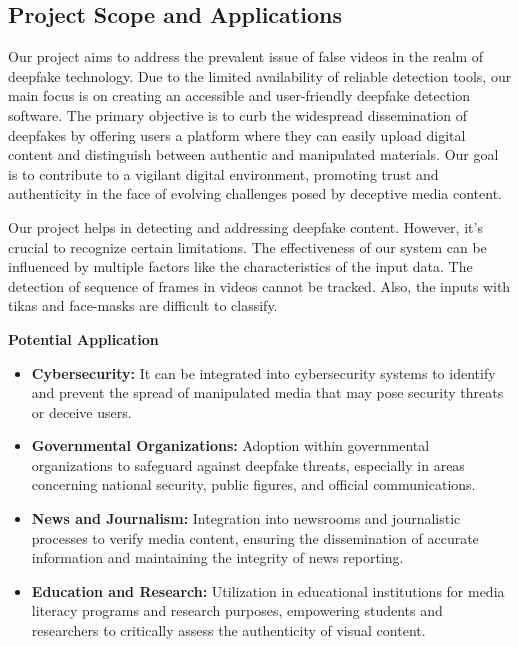 \subsection{Project Scope and Applications}
Our project aims to address the prevalent issue of false videos in the realm of deepfake technology. Due to the limited availability of reliable detection tools, our main focus is on creating an accessible and user-friendly deepfake detection software. The primary objective is to curb the widespread dissemination of deepfakes by offering users a platform where they can easily upload digital content and distinguish between authentic and manipulated materials. Our goal is to contribute to a vigilant digital environment, promoting trust and authenticity in the face of evolving challenges posed by deceptive media content.

\noindent Our project helps in detecting and addressing deepfake content. However, it's crucial to recognize certain limitations. The effectiveness of our system  can be influenced by multiple factors like the characteristics of the input data. The detection of sequence of frames in videos cannot be tracked. Also, the inputs with tikas and face-masks are difficult to classify.\\

\vspace{0.1in}

\noindent \textbf{Potential Application}

\begin{itemize}
    \item \textbf{Cybersecurity:} It can be integrated into cybersecurity systems to identify and prevent the spread of manipulated media that may pose security threats or deceive users.

    \item \textbf{Governmental Organizations:} Adoption within governmental organizations to safeguard against deepfake threats, especially in areas concerning national security, public figures, and official communications.

    \item \textbf{News and Journalism:} Integration into newsrooms and journalistic processes to verify media content, ensuring the dissemination of accurate information and maintaining the integrity of news reporting.

    \item \textbf{Education and Research:} Utilization in educational institutions for media literacy programs and research purposes, empowering students and researchers to critically assess the authenticity of visual content.
\end{itemize}